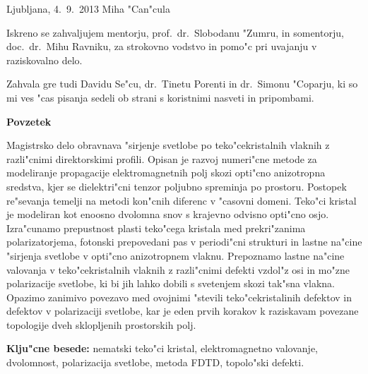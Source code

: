 \documentclass[12pt,twoside,openright,final]{report}
\begin{document}
\bigskip
\bigskip

\noindent
Ljubljana, 4.~9.~2013 \hfill Miha "Can"cula

\vfill

\newpage

\normalsize
\thispagestyle{empty}
\centerline{}
\vfill

\vfill

\vfill

\vfill


\par{\narrower\narrower\narrower\parindent 0pt

Iskreno se zahvaljujem mentorju, prof.~dr.~Slobodanu "Zumru, in somentorju, doc.~dr.~Mihu Ravniku, za strokovno vodstvo in pomo"c pri uvajanju v raziskovalno delo.

\quad

Zahvala gre tudi Davidu Se"cu, dr.~Tinetu Porenti in dr.~Simonu "Coparju, ki so mi ves "cas pisanja sedeli ob strani s koristnimi nasveti in pripombami. 

\par}

\vfill




\newpage

\normalsize
\thispagestyle{plain}

\vfill
\centerline{\bf Povzetek}
\bigskip
\noindent

Magistrsko delo obravnava "sirjenje svetlobe po teko"cekristalnih vlaknih z razli"cnimi direktorskimi profili. 
Opisan je razvoj numeri"cne metode za modeliranje propagacije elektromagnetnih polj skozi opti"cno anizotropna sredstva, kjer se dielektri"cni tenzor poljubno spreminja po prostoru. 
Postopek re"sevanja temelji na metodi kon"cnih diferenc v "casovni domeni. 
Teko"ci kristal je modeliran kot enoosno dvolomna snov s krajevno odvisno opti"cno osjo.
Izra"cunamo prepustnost plasti teko"cega kristala med prekri"zanima polarizatorjema, fotonski prepovedani pas v periodi"cni strukturi in lastne na"cine "sirjenja svetlobe v opti"cno anizotropnem vlaknu. 
Prepoznamo lastne na"cine valovanja v teko"cekristalnih vlaknih z razli"cnimi defekti vzdol"z osi in mo"zne polarizacije svetlobe, ki bi jih lahko dobili s svetenjem skozi tak"sna vlakna. 
Opazimo zanimivo povezavo med ovojnimi "stevili teko"cekristalinih defektov in defektov v polarizaciji svetlobe, kar je eden prvih korakov k raziskavam povezane topologije dveh sklopljenih prostorskih polj. 


\bigskip
\noindent
{\bf Klju"cne besede:} nematski teko"ci kristal, elektromagnetno valovanje, dvolomnost, polarizacija svetlobe, metoda FDTD, topolo"ski defekti.
\end{document}
